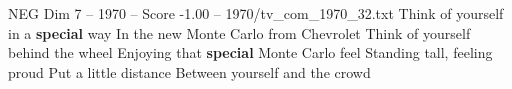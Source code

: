 \begin{textsample}{NEG Dim 7 – 1970 – Score -1.00 – 1970/tv\_com\_1970\_32.txt}  \label{ex:f7_neg_060}
Think of yourself in a \textbf{special} way In the new Monte Carlo from Chevrolet Think of yourself behind the wheel Enjoying that \textbf{special} Monte Carlo feel Standing tall, feeling proud Put a little distance Between yourself and the crowd

\end{textsample}
